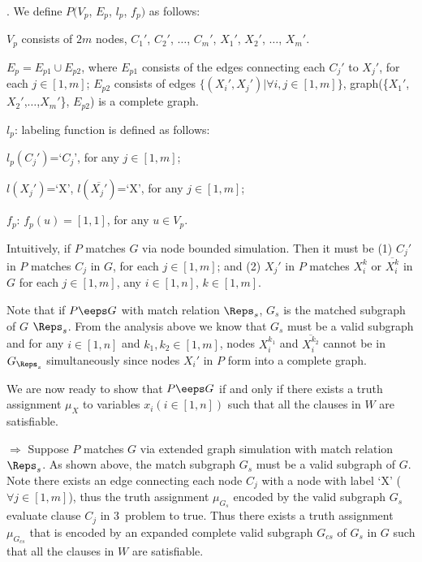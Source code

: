 . We define $P(V_p$, $E_p$, $l_p$, $f_p)$ as follows:
\be
\item [(1)]$V_p$ consists of $2m$ nodes, $C_1'$, $C_2'$, $\ldots$, $C_m'$, $X_1'$, $X_2'$, $\ldots$, $X_m'$.
\item [(2)]$E_p = E_{p1} \cup E_{p2}$, where $E_{p1}$ consists of the edges connecting each $C_j'$ to $X_j'$, for each $j \in [1,m]$; $E_{p2}$ consists of edges $\{(X_i',X_j')| \forall i,j \in [1,m]\}$, \ie graph(\{$X_1'$,$X_2'$,$\ldots$,$X_m'$\}, $E_{p2}$) is a complete graph.
\item [(3)]$l_p$: labeling function is defined as follows:
\be
\item [(a)]$l_p(C_j')$=`$C_j$', for any $j \in [1,m]$;
\item [(b)]$l(X_j')$=`X', $l(\overline{X_j'})$=`X', for any $j \in [1,m]$;
\ee
\item [(4)]$f_p$: $f_p(u)=[1,1]$, for any $u \in V_p$.
\ee

Intuitively, if $P$ matches $G$ via node bounded simulation. Then it must be (1) $C_j'$ in $P$ matches $C_j$ in $G$, for each $j \in [1,m]$; and (2) $X_j'$ in $P$ matches  $X_i^k$ or $\overline{X_i^k}$ in $G$ for each $j \in [1,m]$, any $i \in [1,n]$, $k \in [1,m]$.

Note that if $P \eeps G$ with match relation $\Reps_s$, $G_s$ is the matched subgraph of $G$ \wrt $\Reps_s$. From the analysis above we know that $G_s$ must be a valid subgraph and for any $i\in[1,n]$ and $k_1, k_2\in[1,m]$, nodes $X_i^{k_1}$ and $\overline{X_i^{k_2}}$ cannot be in $G_{\Reps_s}$ simultaneously since nodes $X_i'$ in $P$ form into a complete graph.

We are now ready to show that $P \eeps G$ if and only if there exists a truth assignment $\mu_X$ to variables $x_i(i\in[1,n])$ such that all the clauses in $W$ are satisfiable.

\stab
$\Rightarrow$
Suppose $P$ matches $G$ via extended graph simulation with match relation $\Reps_s$. As shown above, the match subgraph $G_s$ must be a valid subgraph of $G$. Note there exists an edge connecting each node $C_j$ with a node with label `X' ($\forall j\in [1,m]$), thus the truth assignment $\mu_{G_s}$ encoded by the valid subgraph $G_s$ evaluate clause $C_j$ in 3\SAT\ problem to true. Thus there exists a truth assignment $\mu_{G_{cs}}$ that is encoded by an expanded complete valid subgraph $G_{cs}$ of $G_s$ in $G$ such that all the clauses in $W$ are satisfiable.

